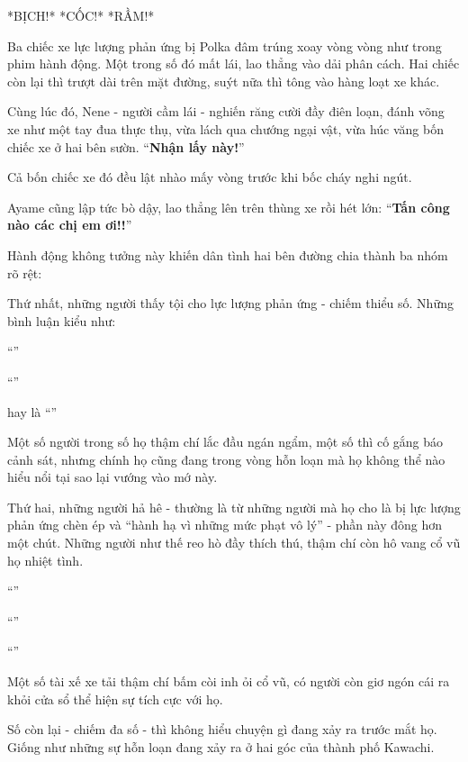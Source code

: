 \documentclass[../main.tex]{subfiles}
\begin{document}
*BỊCH!* *CỐC!* *RẦM!*

Ba chiếc xe lực lượng phản ứng bị Polka đâm trúng xoay vòng vòng như trong phim hành động. Một trong số đó mất lái, lao thẳng vào dải phân cách. Hai chiếc còn lại thì trượt dài trên mặt đường, suýt nữa thì tông vào hàng loạt xe khác.

Cùng lúc đó, Nene - người cầm lái - nghiến răng cười đầy điên loạn, đánh võng xe như một tay đua thực thụ, vừa lách qua chướng ngại vật, vừa húc văng bốn chiếc xe ở hai bên sườn. ``\textbf{Nhận lấy này!}''

Cả bốn chiếc xe đó đều lật nhào mấy vòng trước khi bốc cháy nghi ngút.

Ayame cũng lập tức bò dậy, lao thẳng lên trên thùng xe rồi hét lớn: ``\textbf{Tấn công nào các chị em ơi!!}''

Hành động không tưởng này khiến dân tình hai bên đường chia thành ba nhóm rõ rệt:

Thứ nhất, những người thấy tội cho lực lượng phản ứng - chiếm thiểu số. Những bình luận kiểu như:

``''

``''

hay là ``''

Một số người trong số họ thậm chí lắc đầu ngán ngẩm, một số thì cố gắng báo cảnh sát, nhưng chính họ cũng đang trong vòng hỗn loạn mà họ không thể nào hiểu nổi tại sao lại vướng vào mớ này.

Thứ hai, những người hả hê - thường là từ những người mà họ cho là bị lực lượng phản ứng chèn ép và ``hành hạ vì những mức phạt vô lý'' - phần này đông hơn một chút. Những người như thế reo hò đầy thích thú, thậm chí còn hô vang cổ vũ họ nhiệt tình.

``''

``''

``''

Một số tài xế xe tải thậm chí bấm còi inh ỏi cổ vũ, có người còn giơ ngón cái ra khỏi cửa sổ thể hiện sự tích cực với họ.

Số còn lại - chiếm đa số - thì không hiểu chuyện gì đang xảy ra trước mắt họ. Giống như những sự hỗn loạn đang xảy ra ở hai góc của thành phố Kawachi.
\end{document}
